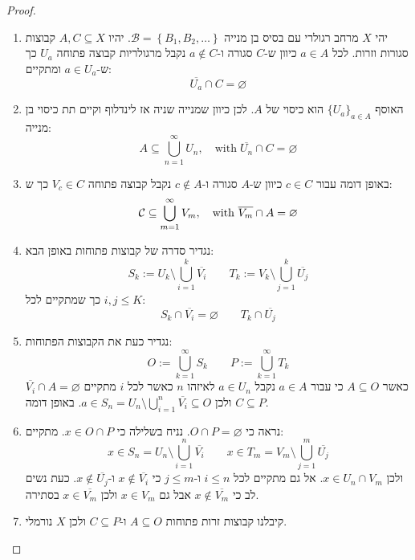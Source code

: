 \documentclass{tstextbook}
\begin{document}
\begin{proof}
  \begin{enumerate}
    \item יהי \(X\) מרחב רגולרי עם בסיס בן מנייה \(\mathcal{B}=\left\{  B_{1},B_{2},\dots  \right\}\). יהיו \(A,C \subseteq X\) קבוצות סגורות וזרות. לכל \(a \in A\) כיוון ש-\(C\) סגורה ו-\(a \not \in C\) נקבל מרגולריות קבוצה פתוחה \(U_{a}\) כך ש-\(a \in U_{a}\) ומתקיים: 
$$\overline{U_{a}} \cap C=\varnothing $$


    \item האוסף \(\{ U_{a} \}_{a \in A}\) הוא כיסוי של \(A\). לכן כיוון שמנייה שניה אז לינדלוף וקיים תת כיסוי בן מנייה: 
$$A\subseteq\bigcup_{n=1}^{\infty}U_{n},\quad{\mathrm{with}}\;{\overline{{U_{n}}}}\cap C=\varnothing $$


    \item באופן דומה עבור \(c \in C\) כיוון ש-\(A\) סגורה ו-\(c \not \in A\) נקבל קבוצה פתוחה \(V_{c}\in C\) כך ש: 
$${\cal C}\subseteq\bigcup_{m=1}^{\infty}V_{m},\quad\mathrm{with}\ \overline{{{V_{m}}}}\cap{ A}=\varnothing $$


    \item נגדיר סדרה של קבוצות פתוחות באופן הבא: 
$$S_{k}:=U_{k}\setminus\bigcup_{i=1}^{k}{\overline{{V_{i}}}}\qquad T_{k}:=V_{k}\setminus\bigcup_{j=1}^{k}{\overline{{U_{j}}}}$$
כך שמתקיים לכל \(i,j\leq K\):
$$S_{k}\cap{\overline{{V_{i}}}}=\varnothing \qquad T_{k}\cap \overline{U_{j}} $$


    \item נגדיר כעת את הקבוצות הפתוחות: 
$${ O}:=\bigcup_{k=1}^{\infty}S_{k}\qquad P:=\bigcup_{k=1}^{\infty}T_{k}$$
כאשר \(A\subseteq O\) כי עבור \(a \in A\) נקבל \(a \in U_{n}\) לאיזהו \(n\) כאשר לכל \(i\) מתקיים \(\overline{V_{i}}\cap A=\varnothing\) ולכן \(a \in S_{n}=U_{n}\setminus \bigcup_{i=1}^{n}\overline{V_{i}}\subseteq O\). באופן דומה \(C\subseteq P\).


    \item נראה כי \(O \cap P=\varnothing\). נניח בשלילה כי \(x \in O\cap P\). מתקיים: 
$$x\in S_{n}=U_{n}\setminus\bigcup_{i=1}^{n}{\overline{{V_{i}}}}\qquad x\in T_{m}=V_{m}\setminus\bigcup_{j=1}^{m}{\overline{{U_{j}}}}$$
ולכן \(x \in U_{n}\cap V_{m}\). אל גם מתקיים לכל \(i\leq n\) ו-\(j\leq m\) כי \(x \not \in \overline{V_{i}}\) ו-\(x\not \in \overline{U_{j}}\). כעת נשים לב כי \(x \not \in \overline{V_{m}}\) אבל גם \(x \in V_{m}\) ולכן \(x \in \overline{V_{m}}\) בסתירה.


    \item קיבלנו קבוצות זרות פתוחות \(A\subseteq O\) ו-\(C\subseteq P\) ולכן \(X\) נורמלי. 


  \end{enumerate}
\end{proof}
\end{document}
